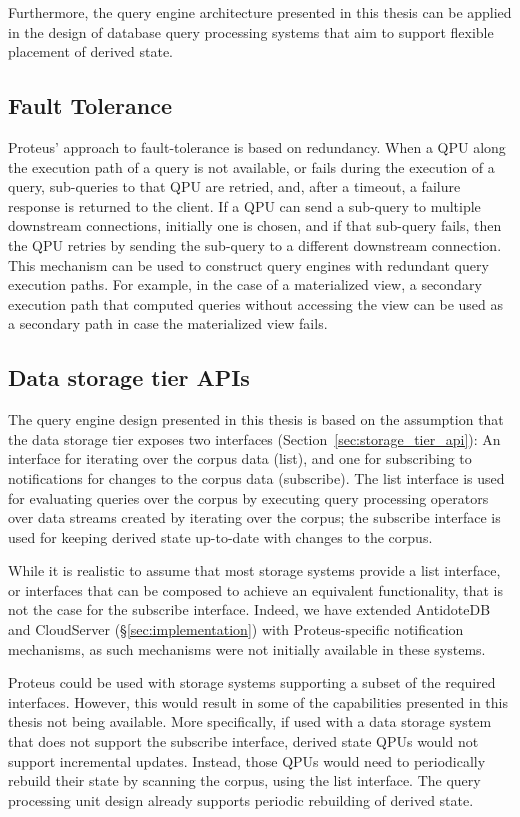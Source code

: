 Furthermore, the query engine architecture presented in this thesis can be applied in the design of database query processing
systems that aim to support flexible placement of derived state.

\subsection{Fault Tolerance}

Proteus' approach to fault-tolerance is based on redundancy.
When a QPU along the execution path of a query is not available, or fails during the execution of a query,
sub-queries to that QPU are retried, and, after a timeout, a failure response is returned to the client.
If a QPU can send a sub-query to multiple downstream connections, initially one is chosen,
and if that sub-query fails, then the QPU retries by sending the sub-query to a different downstream connection.
This mechanism can be used to construct query engines with redundant query execution paths.
For example, in the case of a materialized view, a secondary execution path that computed queries without accessing
the view can be used as a secondary path in case the materialized view fails.

\subsection{Data storage tier APIs}

The query engine design presented in this thesis is based on the assumption that the data storage tier exposes
two interfaces (Section~\ref{sec:storage_tier_api}):
An interface for iterating over the corpus data (list), and one for subscribing to notifications for changes to the
corpus data (subscribe).
The list interface is used for evaluating queries over the corpus by executing query processing operators over data streams
created by iterating over the corpus;
the subscribe interface is used for keeping derived state up-to-date with changes to the corpus.

While it is realistic to assume that most storage systems provide a list interface,
or interfaces that can be composed to achieve an equivalent functionality,
that is not the case for the subscribe interface.
Indeed, we have extended AntidoteDB and CloudServer (\S\ref{sec:implementation}) with Proteus-specific
notification mechanisms,
as such mechanisms were not initially available in these systems.

Proteus could be used with storage systems supporting a subset of the required interfaces.
However, this would result in some of the capabilities presented in this thesis not being available.
More specifically, if used with a data storage system that does not support the subscribe interface,
derived state QPUs would not support incremental updates.
Instead, those QPUs would need to periodically rebuild their state by scanning the corpus, using the list interface.
The query processing unit design already supports periodic rebuilding of derived state.

